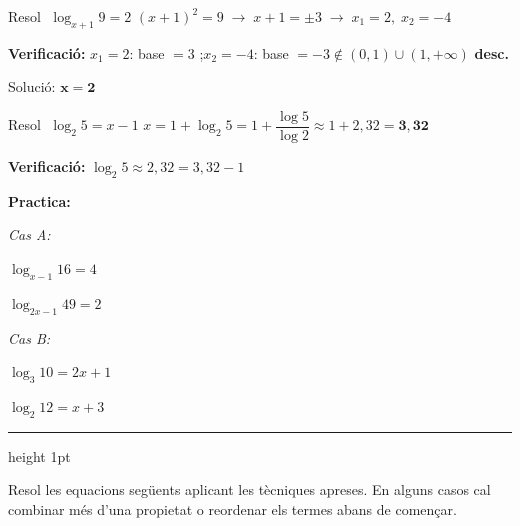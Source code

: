 \documentclass[12pt,a4paper]{article}
\begin{document}
\vspace{0.1cm}

\begin{tcolorbox}[exemplebox, title={Exemple resolt --- Cas A: base incògnita}]
Resol $\;\log_{x+1} 9 = 2$
\tcblower
$(x+1)^2 = 9 \;\longrightarrow\; x+1=\pm 3 \;\longrightarrow\; x_1=2,\; x_2=-4$

\textbf{Verificació:} $x_1=2$: base $=3$ \checkmark;\quad $x_2=-4$: base $=-3\notin(0,1)\cup(1,+\infty)$ \textbf{desc.}

Solució: $\boldsymbol{x=2}$
\end{tcolorbox}

\vspace{0.15cm}

\begin{tcolorbox}[exemplebox, title={Exemple resolt --- Cas B: incògnita fora del logaritme}]
Resol $\;\log_2 5 = x - 1$
\tcblower
$x = 1 + \log_2 5 = 1 + \dfrac{\log 5}{\log 2} \approx 1 + 2{,}32 = \boldsymbol{3{,}32}$

\textbf{Verificació:} $\log_2 5 \approx 2{,}32 = 3{,}32 - 1$ \checkmark
\end{tcolorbox}

\vspace{0.2cm}
\noindent\textbf{Practica:}

\noindent\textit{Cas A:}
\begin{exercicis}
    \item $\log_{x-1} 16 = 4$
    \item $\log_{2x-1} 49 = 2$
\end{exercicis}

\noindent\textit{Cas B:}
\begin{exercicis}[start=3]
    \item $\log_3 10 = 2x + 1$
    \item $\log_2 12 = x + 3$
\end{exercicis}

\newpage

\vspace{0.2cm}
\vspace{0.12cm}\hrule height 1pt\vspace{0.3cm}

\noindent Resol les equacions següents aplicant les tècniques apreses. En alguns casos cal combinar més d'una propietat o reordenar els termes abans de començar.
\end{document}
